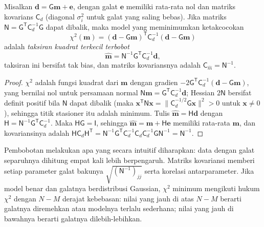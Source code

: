\begin{theorem}\label{thm:b3:seismology-imaging:wls}
Misalkan $\mathbf d = \mathsf G\mathbf m + \mathbf e$, dengan galat $\mathbf e$
memiliki rata-rata nol dan matriks kovarians $\mathsf C_d$ (diagonal
$\sigma_i^2$ untuk galat yang saling bebas). Jika matriks
$\mathsf N = \mathsf G^{\mathsf T}\mathsf C_d^{-1}\mathsf G$ dapat dibalik, maka
model yang meminimumkan ketakcocokan
\[
  \chi^2(\mathbf m) = (\mathbf d - \mathsf G\mathbf m)^{\mathsf T}\mathsf C_d^{-1}
  (\mathbf d - \mathsf G\mathbf m)
\]
adalah \emph{taksiran kuadrat terkecil terbobot}
\[
  \hat{\mathbf m} = \mathsf N^{-1}\mathsf G^{\mathsf T}\mathsf C_d^{-1}\mathbf d ,
\]
taksiran ini bersifat tak bias, dan matriks kovariansnya adalah
$\mathsf C_{\hat m} = \mathsf N^{-1}$.
\end{theorem}

\begin{proof}
$\chi^2$ adalah fungsi kuadrat dari $\mathbf m$ dengan gradien
$-2\mathsf G^{\mathsf T}\mathsf C_d^{-1}(\mathbf d - \mathsf G\mathbf m)$, yang
bernilai nol untuk persamaan normal $\mathsf N\mathbf m = \mathsf G^{\mathsf T}
\mathsf C_d^{-1}\mathbf d$; Hessian $2\mathsf N$ bersifat definit positif bila
$\mathsf N$ dapat dibalik (maka $\mathbf x^{\mathsf T}\mathsf N\mathbf x =
\|\mathsf C_d^{-1/2}\mathsf G\mathbf x\|^2 > 0$ untuk $\mathbf x \ne 0$), sehingga
titik stasioner itu adalah minimum. Tulis $\hat{\mathbf m} = \mathsf H\mathbf d$ dengan
$\mathsf H = \mathsf N^{-1}\mathsf G^{\mathsf T}\mathsf C_d^{-1}$. Maka
$\mathsf H\mathsf G = \mathsf I$, sehingga $\hat{\mathbf m} = \mathbf m + \mathsf H\mathbf e$
memiliki rata-rata $\mathbf m$, dan kovariansinya adalah
$\mathsf H\mathsf C_d\mathsf H^{\mathsf T} =
\mathsf N^{-1}\mathsf G^{\mathsf T}\mathsf C_d^{-1}\mathsf C_d\mathsf C_d^{-1}
\mathsf G\mathsf N^{-1} = \mathsf N^{-1}$.
\end{proof}

Pembobotan melakukan apa yang secara intuitif diharapkan: data dengan galat separuhnya
dihitung empat kali lebih berpengaruh. Matriks kovariansi memberi setiap parameter
galat bakunya $\sqrt{(\mathsf N^{-1})_{jj}}$ serta korelasi antarparameter. Jika model
benar dan galatnya berdistribusi Gaussian, $\chi^2$ minimum mengikuti hukum $\chi^2$
dengan $N - M$ derajat kebebasan: nilai yang jauh di atas $N - M$ berarti galatnya
diremehkan atau modelnya terlalu sederhana; nilai yang jauh di bawahnya berarti galatnya
dilebih-lebihkan.

